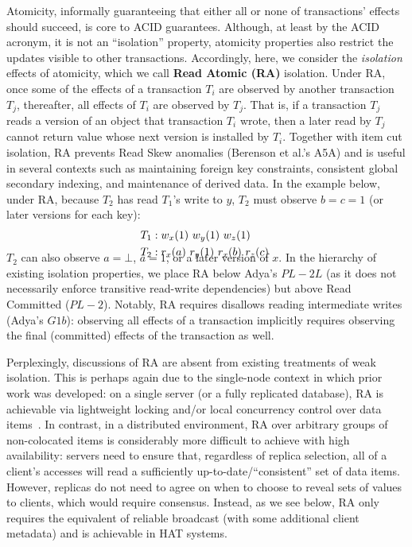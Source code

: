 Atomicity, informally guaranteeing that either all or none of
transactions' effects should succeed, is core to ACID
guarantees. Although, at least by the ACID acronym, it is not an
``isolation'' property, atomicity properties also restrict the updates
visible to other transactions. Accordingly, here, we consider the
\textit{isolation} effects of atomicity, which we call \textbf{Read
  Atomic (RA)} isolation.  Under RA, once some of the effects of a
transaction $T_i$ are observed by another transaction $T_j$,
thereafter, all effects of $T_i$ are observed by $T_j$. That is, if a
transaction $T_j$ reads a version of an object that transaction $T_i$
wrote, then a later read by $T_j$ cannot return value whose next
version is installed by $T_i$. Together with item cut isolation, RA
prevents Read Skew anomalies (Berenson et al.'s A5A) and is useful in
several contexts such as maintaining foreign key constraints,
consistent global secondary indexing, and maintenance of derived
data. In the example below, under RA, because $T_2$ has read $T_1$'s
write to $y$, $T_2$ must observe $b=c=1$ (or later versions for each
key):
\begin{align*}
\small
T_1 &: w_x(1)~w_y(1)~w_z(1)
\\T_2 &: r_x(a)~r_y(1)~r_x(b)~r_z(c)~\\[-1.5em]
\end{align*}
$T_2$ can also observe $a=\bot$, $a=1$, or a later version of $x$. In
the hierarchy of existing isolation properties, we place RA below
Adya's $PL-2L$ (as it does not necessarily enforce transitive
read-write dependencies) but above Read Committed ($PL-2$). Notably,
RA requires disallows reading intermediate writes (Adya's $G1b$):
observing all effects of a transaction implicitly requires observing
the final (committed) effects of the transaction as well.

Perplexingly, discussions of RA are absent from existing treatments of
weak isolation. This is perhaps again due to the single-node context
in which prior work was developed: on a single server (or a fully
replicated database), RA is achievable via lightweight locking and/or
local concurrency control over data items~\cite{gstore,
  kemme-thesis}. In contrast, in a distributed environment, RA over
arbitrary groups of non-colocated items is considerably more difficult
to achieve with high availability: servers need to ensure that,
regardless of replica selection, all of a client's accesses will read
a sufficiently up-to-date/``consistent'' set of data items. However,
replicas do not need to agree on when to choose to reveal sets of
values to clients, which would require consensus. Instead, as we see
below, RA only requires the equivalent of reliable broadcast (with
some additional client metadata) and is achievable in HAT systems.

